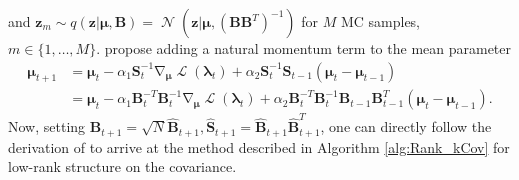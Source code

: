 \documentclass[a4paper, 11pt, oneside]{scrartcl}
\theoremstyle{break}
\DeclareMathOperator{\Normal}{\mathcal{N}}
\DeclareMathOperator{\grad}{\nabla}
\DeclareMathOperator{\ELBO}{\mathcal{L}}
\newcommand{\matr}[1]{\boldsymbol{#1}}
\numberwithin{equation}{section}
\begin{document}
				and $\matr{z}_m \sim q(\matr{z} | \matr{\mu}, \matr{B}) = \Normal(\matr{z} | \matr{\mu}, (\matr{B} \matr{B}^T)^{-1})$ for $M$ MC samples, $m \in \{1, \dots, M\}$.
				\cite{KNT+18, LSK20} propose adding a natural momentum term to the mean parameter
				\begin{align*}
					\matr{\mu}_{t+1} &= \matr{\mu}_t - \alpha_1 \matr{S}_t^{-1} \grad_{\matr{\mu}} \ELBO (\matr{\lambda}_t) + \alpha_2 \matr{S}_t^{-1} \matr{S}_{t-1} (\matr{\mu}_t - \matr{\mu}_{t-1}) \\
					&= \matr{\mu}_t - \alpha_1 \matr{B}_t^{-T} \matr{B}_t^{-1} \grad_{\matr{\mu}} \ELBO (\matr{\lambda}_t) + \alpha_2 \matr{B}_t^{-T} \matr{B}_t^{-1} \matr{B}_{t-1} \matr{B}_{t-1}^T (\matr{\mu}_t - \matr{\mu}_{t-1}).
				\end{align*}
				Now, setting $\matr{B}_{t+1} = \sqrt{N} \matr{\hat{B}}_{t+1}, \matr{\hat{S}}_{t+1} = \matr{\hat{B}}_{t+1} \matr{\hat{B}}_{t+1}^T$, one can directly follow the derivation of \cite[Sec. E.3]{LSK20} to arrive at the method described in Algorithm \ref{alg:Rank_kCov} for low-rank structure on the covariance.
\end{document}
